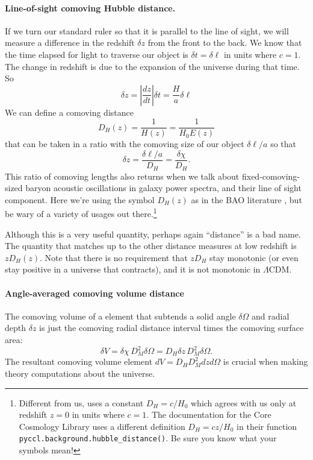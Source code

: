 \paragraph{Line-of-sight comoving Hubble distance.}  If we turn our standard ruler so that it is parallel to the line of sight, we will measure a difference in the redshift $\delta z$ from the front to the back.  We know that the time elapsed for light to traverse our object is $\delta t = \delta\ell$ in units where $c=1$.  The change in redshift is due to the expansion of the universe during that time.
So
\begin{equation}
  \delta z = \left| \frac{dz}{dt} \right| \delta t = \frac{H}{a} \delta\ell
\end{equation}
We can define a comoving distance
\begin{equation}
  D_H(z) = \frac{1}{H(z)} = \frac{1}{H_0 E(z)}
\end{equation}
that can be taken in a ratio with the comoving size of our object $\delta\ell/a$  so that
\begin{equation}
   \delta z = \frac{\delta\ell/a}{D_H} = \frac{\delta\chi}{D_H}.
\end{equation}
This ratio of comoving lengths also returns when we talk about fixed-comoving-sized baryon acoustic oscillations in galaxy power spectra, and their line of sight component.
Here we're using the symbol $D_H(z)$ as in the BAO literature \citep[e.g.][]{2025JCAP...02..021A}, but be wary of a variety of usages out there.\footnote{Different from us, \citet{1999astro.ph..5116H} uses a constant $D_H = c/H_0$ which agrees with us only at redshift $z=0$ in units where $c=1$.  The documentation for the Core Cosmology Library \citep{2019ApJS..242....2C} uses a different definition $D_H = cz/H_0$ in their function \texttt{pyccl.background.hubble\_distance()}.  Be sure you know what your symbols mean!}

  Although this is a very useful quantity, perhaps again ``distance'' is a bad name.  The quantity that matches up to the other distance measures at low redshift is $z D_H(z)$.  Note that there is no requirement that $z D_H$ stay monotonic (or even stay positive in a universe that contracts), {and it is not monotonic in $\Lambda$CDM}. 

  \paragraph{Angle-averaged comoving volume distance}  The comoving volume of a element that subtends a solid angle $\delta\Omega$ and radial depth $\delta z$ is just the comoving radial distance interval times the comoving surface area:
\begin{equation}
  \delta V = \delta\chi \, D_M^2 \delta\Omega = D_H \delta z \, D_M^2 \delta\Omega.
\end{equation}
The resultant comoving volume element $dV = D_H D_M^2 dz d\Omega$ is crucial when making theory computations about the universe.

